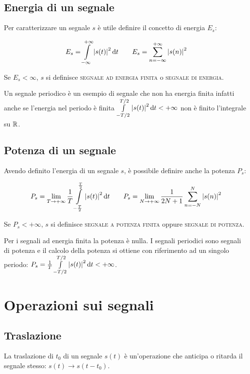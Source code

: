 \subsection{Energia di un segnale}
Per caratterizzare un segnale $s$ è utile definire il concetto di energia $E_s$:

\begin{equation}
\label{eq:segnale_energia}
	E_s=\int\limits_{-\infty}^{+\infty}{\left|{s(t)}\right|^2}{\,\mathop{}\!\mathrm{d}{t}} \qquad E_s=\sum_{n=-\infty}^{+\infty}\left|{s(n)}\right|^2
\end{equation}

Se $E_s < \infty$, $s$  si definisce \textsc{segnale ad energia finita} o \textsc{segnale di energia}.

Un segnale periodico è un esempio di segnale che non ha energia finita infatti anche se l'energia nel periodo è finita $\int\limits_{-T/2}^{T/2}{\left|{s(t)}\right|^2}{\,\mathop{}\!\mathrm{d}{t}}<+\infty$ non è finito l'integrale su $\mathbb{R}$.

\subsection{Potenza di un segnale}
Avendo definito l'energia di un segnale $s$, è possibile definire anche la potenza $P_s$:

\begin{equation}
\label{eq:segnale_potenza}
	P_s=\lim\limits_{T\to+\infty}{\frac{1}{T}\int\limits_{-\frac{T}{2}}^{\frac{T}{2}}{\left|{s(t)}\right|^2}{\,\mathop{}\!\mathrm{d}{t}}}\qquad
	P_s=\lim\limits_{N\to+\infty}{\frac{1}{2N+1}\sum_{n=-N}^{N}{\left|{s(n)}\right|^2}}
\end{equation}

Se $P_s<+\infty$, $s$ si definisce \textsc{segnale a potenza finita} oppure \textsc{segnale di potenza}.

Per i segnali ad energia finita la potenza è nulla. I segnali periodici sono segnali di potenza e il calcolo della potenza si ottiene con riferimento ad un singolo periodo: $P_s=\frac{1}{T}\int\limits_{-T/2}^{T/2}{\left|{s(t)}\right|^2}{\,\mathop{}\!\mathrm{d}{t}}<+\infty$.

\section{Operazioni sui segnali}
\subsection{Traslazione}
La traslazione di $t_0$ di un segnale $s(t)$ è un'operazione che anticipa o ritarda il segnale stesso: $s(t) \to s(t-t_0)$.

